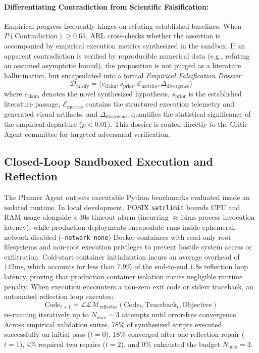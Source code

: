 \documentclass[10pt,twocolumn,letterpaper]{article}
\begin{document}
\paragraph{Differentiating Contradiction from Scientific Falsification:}
Empirical progress frequently hinges on refuting established baselines. When $P(\text{Contradiction}) \ge 0.65$, ARL cross-checks whether the assertion is accompanied by empirical execution metrics synthesized in the sandbox. If an apparent contradiction is verified by reproducible numerical data (e.g., refuting an assumed asymptotic bound), the proposition is not purged as a literature hallucination, but encapsulated into a formal \textit{Empirical Falsification Dossier}:
\begin{equation}
\mathcal{D}_{\text{falsify}} = \langle c_{\text{claim}}, s_{\text{prior}}, \mathcal{E}_{\text{metrics}}, \Delta_{\text{divergence}} \rangle
\end{equation}
where $c_{\text{claim}}$ denotes the novel synthesized hypothesis, $s_{\text{prior}}$ is the established literature passage, $\mathcal{E}_{\text{metrics}}$ contains the structured execution telemetry and generated visual artifacts, and $\Delta_{\text{divergence}}$ quantifies the statistical significance of the empirical departure ($p < 0.01$). This dossier is routed directly to the Critic Agent committee for targeted adversarial verification.

\subsection{Closed-Loop Sandboxed Execution and Reflection}
The Planner Agent outputs executable Python benchmarks evaluated inside an isolated runtime. In local development, POSIX \texttt{setrlimit} bounds CPU and RAM usage alongside a 30s timeout alarm (incurring $\approx 14\text{ms}$ process invocation latency), while production deployments encapsulate runs inside ephemeral, network-disabled (\texttt{--network none}) Docker containers with read-only root filesystems and non-root execution privileges to prevent hostile system access or exfiltration. Cold-start container initialization incurs an average overhead of $142\text{ms}$, which accounts for less than $7.9\%$ of the end-to-end $1.8\text{s}$ reflection loop latency, proving that production container isolation incurs negligible runtime penalty. When execution encounters a non-zero exit code or stderr traceback, an automated reflection loop executes:
\begin{equation}
\text{Code}_{t+1} = \mathcal{LLM}_{\text{reflector}}\left(\text{Code}_t, \text{Traceback}_t, \text{Objective}\right)
\end{equation}
re-running iteratively up to $N_{\max} = 3$ attempts until error-free convergence. Across empirical validation suites, 78\% of synthesized scripts executed successfully on initial pass ($t=0$), 18\% converged after one reflection repair ($t=1$), 4\% required two repairs ($t=2$), and 0\% exhausted the budget $N_{\max} = 3$.
\end{document}
